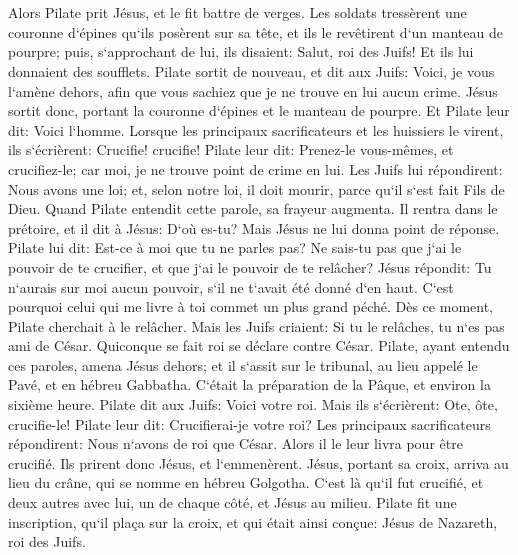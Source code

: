 \chapter{}

\verse Alors Pilate prit Jésus, et le fit battre de verges. 
\verse Les soldats tressèrent une couronne d`épines qu`ils posèrent sur sa tête, et ils le revêtirent d`un manteau de pourpre; puis, s`approchant de lui, 
\verse ils disaient: Salut, roi des Juifs! Et ils lui donnaient des soufflets. 
\verse Pilate sortit de nouveau, et dit aux Juifs: Voici, je vous l`amène dehors, afin que vous sachiez que je ne trouve en lui aucun crime. 
\verse Jésus sortit donc, portant la couronne d`épines et le manteau de pourpre. Et Pilate leur dit: Voici l`homme. 
\verse Lorsque les principaux sacrificateurs et les huissiers le virent, ils s`écrièrent: Crucifie! crucifie! Pilate leur dit: Prenez-le vous-mêmes, et crucifiez-le; car moi, je ne trouve point de crime en lui. 
\verse Les Juifs lui répondirent: Nous avons une loi; et, selon notre loi, il doit mourir, parce qu`il s`est fait Fils de Dieu. 
\verse Quand Pilate entendit cette parole, sa frayeur augmenta. 
\verse Il rentra dans le prétoire, et il dit à Jésus: D`où es-tu? Mais Jésus ne lui donna point de réponse. 
\verse Pilate lui dit: Est-ce à moi que tu ne parles pas? Ne sais-tu pas que j`ai le pouvoir de te crucifier, et que j`ai le pouvoir de te relâcher? 
\verse Jésus répondit: Tu n`aurais sur moi aucun pouvoir, s`il ne t`avait été donné d`en haut. C`est pourquoi celui qui me livre à toi commet un plus grand péché. 
\verse Dès ce moment, Pilate cherchait à le relâcher. Mais les Juifs criaient: Si tu le relâches, tu n`es pas ami de César. Quiconque se fait roi se déclare contre César. 
\verse Pilate, ayant entendu ces paroles, amena Jésus dehors; et il s`assit sur le tribunal, au lieu appelé le Pavé, et en hébreu Gabbatha. 
\verse C`était la préparation de la Pâque, et environ la sixième heure. Pilate dit aux Juifs: Voici votre roi. 
\verse Mais ils s`écrièrent: Ote, ôte, crucifie-le! Pilate leur dit: Crucifierai-je votre roi? Les principaux sacrificateurs répondirent: Nous n`avons de roi que César. 
\verse Alors il le leur livra pour être crucifié. Ils prirent donc Jésus, et l`emmenèrent. 
\verse Jésus, portant sa croix, arriva au lieu du crâne, qui se nomme en hébreu Golgotha. 
\verse C`est là qu`il fut crucifié, et deux autres avec lui, un de chaque côté, et Jésus au milieu. 
\verse Pilate fit une inscription, qu`il plaça sur la croix, et qui était ainsi conçue: Jésus de Nazareth, roi des Juifs. 
